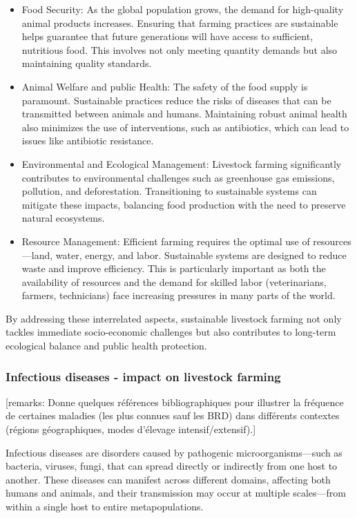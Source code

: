 \begin{itemize}
    \item Food Security: As the global population grows, the demand for high-quality animal products increases. Ensuring that farming practices are sustainable helps guarantee that future generations will have access to sufficient, nutritious food. This involves not only meeting quantity demands but also maintaining quality standards.
    \item Animal Welfare and public Health: The safety of the food supply is paramount. Sustainable practices reduce the risks of diseases that can be transmitted between animals and humans. Maintaining robust animal health also minimizes the use of interventions, such as antibiotics, which can lead to issues like antibiotic resistance.
    \item Environmental and Ecological Management: Livestock farming significantly contributes to environmental challenges such as greenhouse gas emissions, pollution, and deforestation. Transitioning to sustainable systems can mitigate these impacts, balancing food production with the need to preserve natural ecosystems.
    \item Resource Management: Efficient farming requires the optimal use of resources—land, water, energy, and labor. Sustainable systems are designed to reduce waste and improve efficiency. This is particularly important as both the availability of resources and the demand for skilled labor (veterinarians, farmers, technicians) face increasing pressures in many parts of the world.
\end{itemize}

By addressing these interrelated aspects, sustainable livestock farming not only tackles immediate socio-economic challenges but also contributes to long-term ecological balance and public health protection.


\subsubsection{Infectious diseases - impact on livestock farming}

[remarks: Donne quelques références bibliographiques pour illustrer la fréquence de certaines maladies (les plus connues sauf les BRD) dans différents contextes (régions géographiques, modes d’élevage intensif/extensif).]



Infectious diseases are disorders caused by pathogenic microorganisms—such as bacteria, viruses, fungi, that can spread directly or indirectly from one host to another. These diseases can manifest across different domains, affecting both humans and animals, and their transmission may occur at multiple scales—from within a single host to entire metapopulations.


